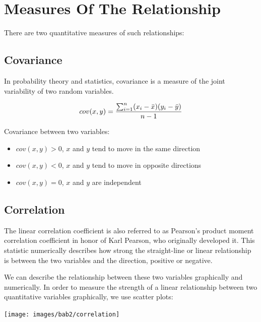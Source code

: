 \documentclass[
]{book}
\providecommand{\tightlist}{%
  \setlength{\itemsep}{0pt}\setlength{\parskip}{0pt}}
\begin{document}
\hypertarget{measures-of-the-relationship}{%
\section{Measures Of The Relationship}\label{measures-of-the-relationship}}

There are two quantitative measures of such relationships:

\hypertarget{covariance}{%
\subsection{Covariance}\label{covariance}}

In probability theory and statistics, covariance is a measure of the joint variability of two random variables.

\[
\begin{aligned}
cov(x,y)={\sum^n_{i=1} (x_i-\bar{x})(y_i-\bar{y}) \over n-1} \\
\end{aligned}
\]

Covariance between two variables:

\begin{itemize}
\tightlist
\item
  \(cov(x,y) > 0\), \(x\) and \(y\) tend to move in the same direction
\item
  \(cov(x,y) < 0\), \(x\) and \(y\) tend to move in opposite directions
\item
  \(cov(x,y) = 0\), \(x\) and \(y\) are independent
\end{itemize}

\hypertarget{correlation}{%
\subsection{Correlation}\label{correlation}}

The linear correlation coefficient is also referred to as Pearson's product moment correlation coefficient in honor of Karl Pearson, who originally developed it. This statistic numerically describes how strong the straight-line or linear relationship is between the two variables and the direction, positive or negative.

We can describe the relationship between these two variables graphically and numerically. In order to measure the strength of a linear relationship between two quantitative variables graphically, we use scatter plots:

\begin{center}\texttt{[image: images/bab2/correlation]} \end{center}
\end{document}
